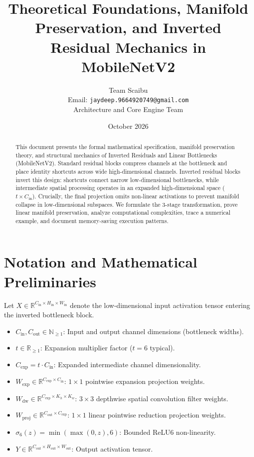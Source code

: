 \documentclass[11pt,a4paper]{article}
\title{\textbf{Theoretical Foundations, Manifold Preservation, and Inverted Residual Mechanics in MobileNetV2}}
\author{Team Scaibu \\ \small Email: \texttt{jaydeep.9664920749@gmail.com} \\ \small Architecture and Core Engine Team}
\date{October 2026}
\theoremstyle{definition}
\begin{document}
\maketitle

\begin{abstract}
This document presents the formal mathematical specification, manifold preservation theory, and structural mechanics of Inverted Residuals and Linear Bottlenecks (MobileNetV2). Standard residual blocks compress channels at the bottleneck and place identity shortcuts across wide high-dimensional channels. Inverted residual blocks invert this design: shortcuts connect narrow low-dimensional bottlenecks, while intermediate spatial processing operates in an expanded high-dimensional space ($t \times C_{\text{in}}$). Crucially, the final projection omits non-linear activations to prevent manifold collapse in low-dimensional subspaces. We formulate the 3-stage transformation, prove linear manifold preservation, analyze computational complexities, trace a numerical example, and document memory-saving execution patterns.
\end{abstract}

\section{Notation and Mathematical Preliminaries}

Let $X \in \mathbb{R}^{C_{\text{in}} \times H_{\text{in}} \times W_{\text{in}}}$ denote the low-dimensional input activation tensor entering the inverted bottleneck block.

\begin{itemize}
    \item $C_{\text{in}}, C_{\text{out}} \in \mathbb{N}_{\ge 1}$: Input and output channel dimensions (bottleneck widths).
    \item $t \in \mathbb{R}_{\ge 1}$: Expansion multiplier factor ($t = 6$ typical).
    \item $C_{\text{exp}} = t \cdot C_{\text{in}}$: Expanded intermediate channel dimensionality.
    \item $W_{\text{exp}} \in \mathbb{R}^{C_{\text{exp}} \times C_{\text{in}}}$: $1 \times 1$ pointwise expansion projection weights.
    \item $W_{\text{dw}} \in \mathbb{R}^{C_{\text{exp}} \times K_h \times K_w}$: $3 \times 3$ depthwise spatial convolution filter weights.
    \item $W_{\text{proj}} \in \mathbb{R}^{C_{\text{out}} \times C_{\text{exp}}}$: $1 \times 1$ linear pointwise reduction projection weights.
    \item $\sigma_6(z) = \min(\max(0, z), 6)$: Bounded ReLU6 non-linearity.
    \item $Y \in \mathbb{R}^{C_{\text{out}} \times H_{\text{out}} \times W_{\text{out}}}$: Output activation tensor.
\end{itemize}
\end{document}
